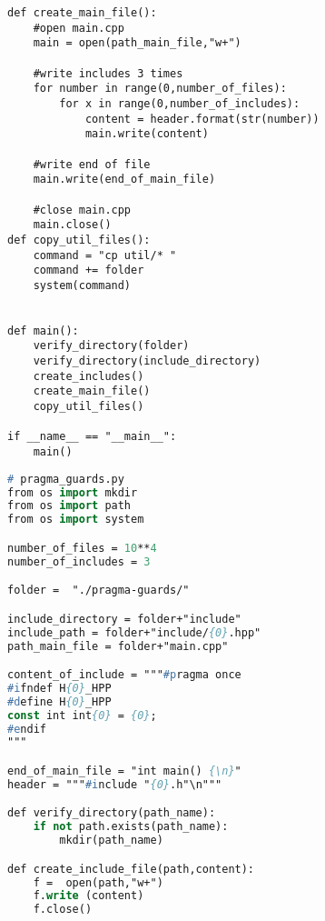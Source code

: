 \begin{apendicesenv}
\begin{lstlisting}
def create_main_file():
    #open main.cpp
    main = open(path_main_file,"w+")

    #write includes 3 times
    for number in range(0,number_of_files):
        for x in range(0,number_of_includes):
            content = header.format(str(number))
            main.write(content)

    #write end of file
    main.write(end_of_main_file)

    #close main.cpp
    main.close()
def copy_util_files():                                                           
    command = "cp util/* "                                                       
    command += folder                                                            
    system(command)                                                              
                    

def main():
    verify_directory(folder)
    verify_directory(include_directory)
    create_includes()
    create_main_file()
    copy_util_files()

if __name__ == "__main__":
    main()
\end{lstlisting}

\begin{lstlisting}[language=Pascal,frame=single,captionpos=b,
                                                caption={
                     Script usando para gerar diretorios com pragma once primeiro que
                                                           Guardas de Inclusão Interna},
                                                            label=script_pragma_guards_include]
# pragma_guards.py
from os import mkdir
from os import path
from os import system

number_of_files = 10**4
number_of_includes = 3

folder =  "./pragma-guards/"

include_directory = folder+"include"
include_path = folder+"include/{0}.hpp"
path_main_file = folder+"main.cpp"

content_of_include = """#pragma once
#ifndef H{0}_HPP
#define H{0}_HPP
const int int{0} = {0};
#endif
"""

end_of_main_file = "int main() {\n}"
header = """#include "{0}.h"\n"""

def verify_directory(path_name):
    if not path.exists(path_name):
        mkdir(path_name)

def create_include_file(path,content):
    f =  open(path,"w+")
    f.write (content)
    f.close()


\end{lstlisting}
\end{apendicesenv}
